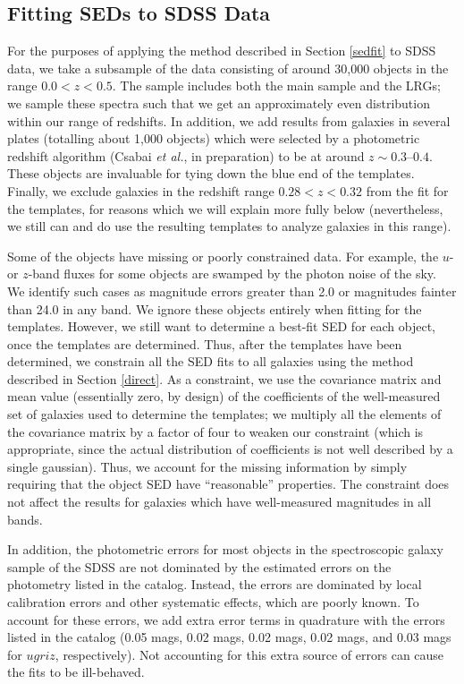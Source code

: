 \documentclass[10pt,preprint]{aastex}
\begin{document}
\subsection{Fitting SEDs to SDSS Data}

For the purposes of applying the method described in Section
\ref{sedfit} to SDSS data, we take a subsample of the data consisting
of around 30,000 objects in the range $0.0<z<0.5$. The sample includes
both the main sample and the LRGs; we sample these spectra such that
we get an approximately even distribution within our range of
redshifts. In addition, we add results from galaxies in several plates
(totalling about 1,000 objects) which were selected by a photometric
redshift algorithm (Csabai {\it et al.}, in preparation) to be at
around $z\sim 0.3$--$0.4$. These objects are invaluable for tying down
the blue end of the templates. Finally, we exclude galaxies in the
redshift range $0.28 <z<0.32$ from the fit for the templates, for
reasons which we will explain more fully below (nevertheless, we still
can and do use the resulting templates to analyze galaxies in this
range).

Some of the objects have missing or poorly constrained data. For
example, the $u$- or $z$-band fluxes for some objects are swamped by
the photon noise of the sky. We identify such cases as magnitude
errors greater than 2.0 or magnitudes fainter than 24.0 in any
band. We ignore these objects entirely when fitting for the
templates. However, we still want to determine a best-fit SED for each
object, once the templates are determined. Thus, after the templates
have been determined, we constrain all the SED fits to all galaxies
using the method described in Section \ref{direct}. As a constraint,
we use the covariance matrix and mean value (essentially zero, by
design) of the coefficients of the well-measured set of galaxies used
to determine the templates; we multiply all the elements of the
covariance matrix by a factor of four to weaken our constraint (which
is appropriate, since the actual distribution of coefficients is not
well described by a single gaussian).  Thus, we account for the
missing information by simply requiring that the object SED have
``reasonable'' properties. The constraint does not affect the results
for galaxies which have well-measured magnitudes in all bands.

In addition, the photometric errors for most objects in the
spectroscopic galaxy sample of the SDSS are not dominated by the
estimated errors on the photometry listed in the catalog. Instead, the
errors are dominated by local calibration errors and other systematic
effects, which are poorly known. To account for these errors, we add
extra error terms in quadrature with the errors listed in the catalog
(0.05 mags, 0.02 mags, 0.02 mags, 0.02 mags, and 0.03 mags for
$ugriz$, respectively). Not accounting for this extra source of errors
can cause the fits to be ill-behaved. 
\end{document}
